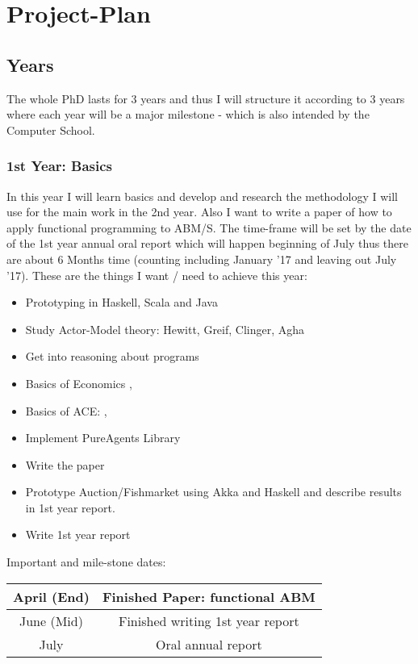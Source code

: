 \section{Project-Plan}

\subsection{Years}
The whole PhD lasts for 3 years and thus I will structure it according to 3 years where each year will be a major milestone - which is also intended by the Computer School.

\subsubsection{1st Year: Basics}
In this year I will learn basics and develop and research the methodology I will use for the main work in the 2nd year. Also I want to write a paper of how to apply functional programming to ABM/S. The time-frame will be set by the date of the 1st year annual oral report which will happen beginning of July thus there are about 6 Months time (counting including January '17 and leaving out July '17). These are the things I want / need to achieve this year:

\begin{itemize}
\item Prototyping in Haskell, Scala and Java
\item Study Actor-Model theory: Hewitt, Greif, Clinger, Agha
\item Get into reasoning about programs
\item Basics of Economics \cite{bowles_understanding_2005}, 
\item Basics of ACE: \cite{KirmanComplex2010}, \cite{Darley2007}
\item Implement PureAgents Library
\item Write the paper
\item Prototype Auction/Fishmarket using Akka and Haskell and describe results in 1st year report.
\item Write 1st year report
\end{itemize}

Important and mile-stone dates:

\begin{center}
\begin{tabular}{ c|c } 
	April (End) & Finished Paper: functional ABM \\ 
	\hline
	June (Mid) & Finished writing 1st year report  \\ 
	\hline
	July & Oral annual report \\
\end{tabular}
\end{center}

